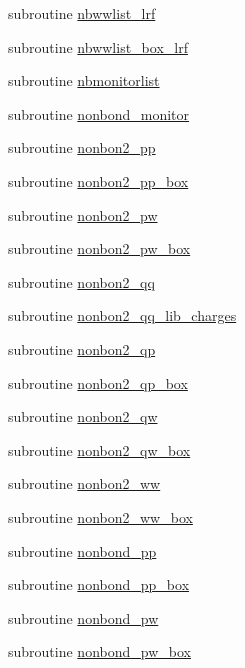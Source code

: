\begin{DoxyCompactItemize}
\item 
subroutine \hyperlink{classmd_a6f5c2fe42a94ba45049cd3bef37f4732}{nbwwlist\-\_\-lrf}
\item 
subroutine \hyperlink{classmd_a927125ccc601291d7b2c627b71651e73}{nbwwlist\-\_\-box\-\_\-lrf}
\item 
subroutine \hyperlink{classmd_a0083786dd20025ff97755427213821ca}{nbmonitorlist}
\item 
subroutine \hyperlink{classmd_a2dd9df07bc719d116e1e9e6fcfb00ae7}{nonbond\-\_\-monitor}
\item 
subroutine \hyperlink{classmd_a6fc5cb6151b3b7091f75e1350d03777e}{nonbon2\-\_\-pp}
\item 
subroutine \hyperlink{classmd_af64c015135f65eaf11c192e0e90c4895}{nonbon2\-\_\-pp\-\_\-box}
\item 
subroutine \hyperlink{classmd_a1e77a7a46b1d66bfa975637721ca05e0}{nonbon2\-\_\-pw}
\item 
subroutine \hyperlink{classmd_a1068d874ddac71e70a88e799142278d1}{nonbon2\-\_\-pw\-\_\-box}
\item 
subroutine \hyperlink{classmd_ae4087ab838e925ce5a20c5fa0d3ae779}{nonbon2\-\_\-qq}
\item 
subroutine \hyperlink{classmd_addcb49c7875f376007c6675b7a540f28}{nonbon2\-\_\-qq\-\_\-lib\-\_\-charges}
\item 
subroutine \hyperlink{classmd_aefa70f80040408bf0b2894b9f06843e7}{nonbon2\-\_\-qp}
\item 
subroutine \hyperlink{classmd_a8b61e7302a5280527d9db7671238ee96}{nonbon2\-\_\-qp\-\_\-box}
\item 
subroutine \hyperlink{classmd_a7d898f2a7a9957a53140bc46b2a1e064}{nonbon2\-\_\-qw}
\item 
subroutine \hyperlink{classmd_a3d5c5eeae50f3e2851226b499f84c2aa}{nonbon2\-\_\-qw\-\_\-box}
\item 
subroutine \hyperlink{classmd_a73933c20e094e4cdc9e49902ff547dcc}{nonbon2\-\_\-ww}
\item 
subroutine \hyperlink{classmd_a7f361e22ee76a5ed61b6a8e126f2e117}{nonbon2\-\_\-ww\-\_\-box}
\item 
subroutine \hyperlink{classmd_a163f18a42fa2626611d2a43c7789bd84}{nonbond\-\_\-pp}
\item 
subroutine \hyperlink{classmd_a4c88eac9dfefac0006e14ff26b369d56}{nonbond\-\_\-pp\-\_\-box}
\item 
subroutine \hyperlink{classmd_a8c3d7eabe1d90c8d26a1f7d8eb18789d}{nonbond\-\_\-pw}
\item 
subroutine \hyperlink{classmd_a9424901170c11930fe9daaae2da15bd7}{nonbond\-\_\-pw\-\_\-box}

\end{DoxyCompactItemize}
